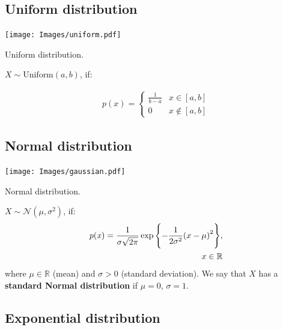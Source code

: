 \documentclass[
  letterpaper,
  12pt,
  british]{tufte-book}
\theoremstyle{plain}
\theoremstyle{plain}
\theoremstyle{definition}
\theoremstyle{remark}
\begin{document}
\hypertarget{sec-uniform_distribution}{%
\subsection{Uniform distribution}\label{sec-uniform_distribution}}

\begin{marginfigure}

{\centering \texttt{[image: Images/uniform.pdf]}

}

\caption{\label{fig-uniform_distribution}Uniform distribution.}

\end{marginfigure}

\(\mathit{X}\sim \text{Uniform}(a,b)\), if:

\begin{align}
    p(\mathit{x})=
    \begin{cases}
        \frac{1}{b-a} & x \in [a,b]\\
        0 & \mathit{x}\notin [a,b]
    \end{cases}
\end{align}

\hypertarget{normal-distribution}{%
\subsection{Normal distribution}\label{normal-distribution}}

\begin{marginfigure}

{\centering \texttt{[image: Images/gaussian.pdf]}

}

\caption{\label{fig-normal_distribution}Normal distribution.}

\end{marginfigure}

\(\mathit{X}\sim \mathcal{N}(\mu, \sigma^2)\), if: \begin{align}
    p(\mathit{x})=\frac{1}{\sigma \sqrt{2\pi}}\exp{\Biggl{\{}{-\frac{1}{2\sigma^2}{(x-\mu)}^2}\Biggr{\}}}, \\~x \in \mathbb{R}\\
\end{align} where \(\mu \in \mathbb{R}\) (mean) and \(\sigma > 0\)
(standard deviation). We say that \(\mathit{X}\) has a \textbf{standard
Normal distribution} if \(\mu = 0\), \(\sigma =1\).

\hypertarget{exponential-distribution}{%
\subsection{Exponential distribution}\label{exponential-distribution}}
\end{document}
